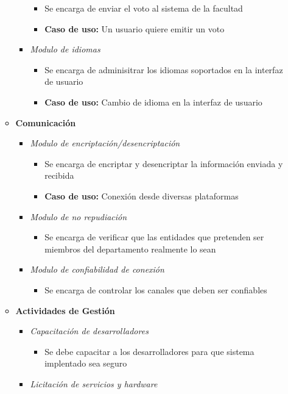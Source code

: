 \begin{itemize}
\begin{itemize}
\begin{itemize}
\begin{itemize}
 \item Se encarga de enviar el voto al sistema de la facultad
 \item {\bf Caso de uso:} Un usuario quiere emitir un voto
\end{itemize}
 \item \emph{Modulo de idiomas}
\begin{itemize}
 \item Se encarga de adminisitrar los idiomas soportados en la interfaz de usuario
 \item {\bf Caso de uso:} Cambio de idioma en la interfaz de usuario
\end{itemize}
\end{itemize}
 \item {\bf Comunicación}
\begin{itemize}
 \item \emph{Modulo de encriptación/desencriptación}
\begin{itemize}
 \item Se encarga de encriptar y desencriptar la información enviada y recibida
 \item {\bf Caso de uso:} Conexión desde diversas plataformas
\end{itemize}
 \item \emph{Modulo de no repudiación}
\begin{itemize}
 \item Se encarga de verificar que las entidades que pretenden ser miembros del departamento realmente lo sean
\end{itemize}
 \item \emph{Modulo de confiabilidad de conexión}
\begin{itemize}
 \item Se encarga de controlar los canales que deben ser confiables
\end{itemize}
\end{itemize}
 \item {\bf Actividades de Gestión}
\begin{itemize}
 \item \emph{Capacitación de desarrolladores}
\begin{itemize}
 \item Se debe capacitar a los desarrolladores para que sistema implentado sea seguro
\end{itemize}
 \item \emph{Licitación de servicios y hardware}
\begin{itemize}

\end{itemize}
\end{itemize}
\end{itemize}
\end{itemize}
